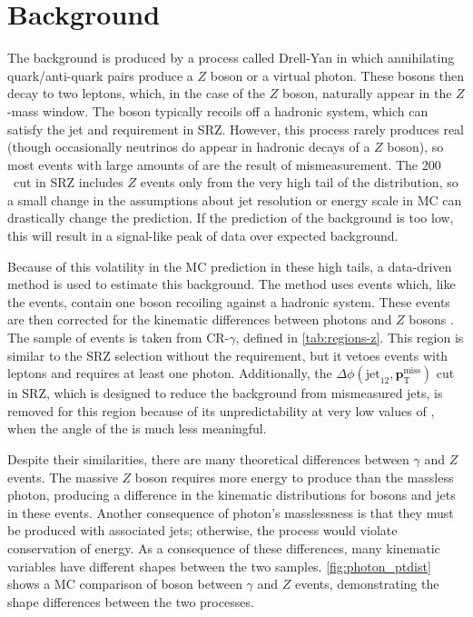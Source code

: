 
\section{\dyjets Background}
\label{sec:bg-z}

The \dyjets background is produced by a process called Drell-Yan in which annihilating quark/anti-quark pairs produce a $Z$ boson or a virtual photon. These bosons then decay to two leptons, which, in the case of the $Z$ boson, naturally appear in the $Z$-mass window. The boson typically recoils off a hadronic system, which can satisfy the jet and \HT requirement in SRZ. However, this process rarely produces real \met (though occasionally neutrinos do appear in hadronic decays of a $Z$ boson), so most events with large amounts of \met are the result of mismeasurement. The 200 \gev~\met cut in SRZ includes $Z$ events only from the very high tail of the \met distribution, so a small change in the assumptions about jet resolution or energy scale in \ac{MC} can drastically change the prediction. If the prediction of the \dyjets background is too low, this will result in a signal-like peak of data over expected background. 

Because of this volatility in the \ac{MC} prediction in these high \met tails, a data-driven method is used to estimate this background. The method uses \gjets events which, like the \dyjets events, contain one boson recoiling against a hadronic system. These \gjets events are then corrected for the kinematic differences between photons and $Z$ bosons \cite{ATLAS:2012ema, Chatrchyan:2012qka}. The sample of \gjets events is taken from CR-$\gamma$, defined in \autoref{tab:regions-z}. This region is similar to the SRZ selection without the \met  requirement, but it vetoes events with leptons and requires at least one photon. Additionally, the $\Delta\phi(\text{jet}_{12},{\boldsymbol p}_{\mathrm{T}}^\mathrm{miss})$ cut in SRZ, which is designed to reduce the background from mismeasured jets, is removed for this region because of its unpredictability at very low values of \met, when the angle of the \met is much less meaningful. 

Despite their similarities, there are many theoretical differences between $\gamma$ and $Z$ events. The massive $Z$ boson requires more energy to produce than the massless photon, producing a difference in the kinematic distributions for bosons and jets in these events. Another consequence of photon's masslessness is that they must be produced with associated jets; otherwise, the process would violate conservation of energy. As a consequence of these differences, many kinematic variables have different shapes between the two samples. \autoref{fig:photon_ptdist} shows a \ac{MC} comparison of boson \pt between $\gamma$ and $Z$ events, demonstrating the shape differences between the two processes. 

